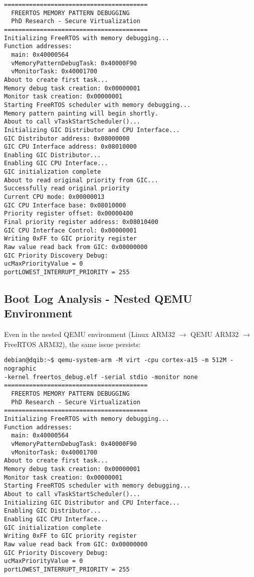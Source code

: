 \documentclass[12pt,a4paper]{article}
\begin{document}
\begin{lstlisting}[caption={Complete Boot Log Showing GIC Priority Register Issue}, basicstyle=\ttfamily\tiny]
========================================
  FREERTOS MEMORY PATTERN DEBUGGING
  PhD Research - Secure Virtualization
========================================
Initializing FreeRTOS with memory debugging...
Function addresses:
  main: 0x40000564
  vMemoryPatternDebugTask: 0x40000F90
  vMonitorTask: 0x40001700
About to create first task...
Memory debug task creation: 0x00000001
Monitor task creation: 0x00000001
Starting FreeRTOS scheduler with memory debugging...
Memory pattern painting will begin shortly.
About to call vTaskStartScheduler()...
Initializing GIC Distributor and CPU Interface...
GIC Distributor address: 0x08000000
GIC CPU Interface address: 0x08010000
Enabling GIC Distributor...
Enabling GIC CPU Interface...
GIC initialization complete
About to read original priority from GIC...
Successfully read original priority
Current CPU mode: 0x00000013
GIC CPU Interface base: 0x08010000
Priority register offset: 0x00000400
Final priority register address: 0x08010400
GIC CPU Interface Control: 0x00000001
Writing 0xFF to GIC priority register
Raw value read back from GIC: 0x00000000
GIC Priority Discovery Debug:
ucMaxPriorityValue = 0
portLOWEST_INTERRUPT_PRIORITY = 255
\end{lstlisting}

\subsection{Boot Log Analysis - Nested QEMU Environment}

Even in the nested QEMU environment (Linux ARM32 $\rightarrow$ QEMU ARM32 $\rightarrow$ FreeRTOS ARM32), the same issue persists:

\begin{lstlisting}[caption={Nested QEMU Boot Log Showing Persistent GIC Issue}, basicstyle=\ttfamily\tiny]
debian@dqib:~$ qemu-system-arm -M virt -cpu cortex-a15 -m 512M -nographic 
-kernel freertos_debug.elf -serial stdio -monitor none
========================================
  FREERTOS MEMORY PATTERN DEBUGGING  
  PhD Research - Secure Virtualization
========================================
Initializing FreeRTOS with memory debugging...
Function addresses:
  main: 0x40000564
  vMemoryPatternDebugTask: 0x40000F90
  vMonitorTask: 0x40001700
About to create first task...
Memory debug task creation: 0x00000001
Monitor task creation: 0x00000001
Starting FreeRTOS scheduler with memory debugging...
About to call vTaskStartScheduler()...
Initializing GIC Distributor and CPU Interface...
Enabling GIC Distributor...
Enabling GIC CPU Interface...
GIC initialization complete
Writing 0xFF to GIC priority register
Raw value read back from GIC: 0x00000000
GIC Priority Discovery Debug:
ucMaxPriorityValue = 0
portLOWEST_INTERRUPT_PRIORITY = 255
\end{lstlisting}
\end{document}

